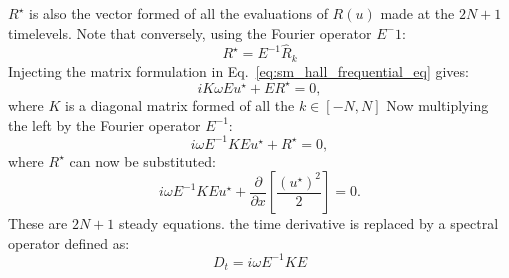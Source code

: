 $R^\star$ is also the vector formed of all the evaluations of $R(u)$
made at the $2N+1$ timelevels. Note that conversely, using the Fourier
operator $E^-1$:
\begin{equation}
	R^\star = E^{-1} \widehat{R}_k
\end{equation}
Injecting the matrix formulation in Eq.~\ref{eq:sm_hall_frequential_eq}
gives:
\begin{equation}
	i K \omega E u^\star + E R^\star = 0,
\end{equation}
where $K$ is a diagonal matrix formed of all the $k \in [-N, N]$
Now multiplying the left by the Fourier operator $E^{-1}$:
\begin{equation}
	i \omega E^{-1} K E u^\star + R^\star = 0,
\end{equation}
where $R^\star$ can now be substituted:
\begin{equation}
	i \omega E^{-1} K E u^\star + 
	\frac{\partial}{\partial x} \left[
	\frac{(u^\star)^2}{2} \right] = 0.
\end{equation}
These are $2N+1$ steady equations.
the time derivative is replaced by a spectral
operator defined as:
\begin{equation}
	D_t = i \omega E^{-1} K E
\end{equation}


